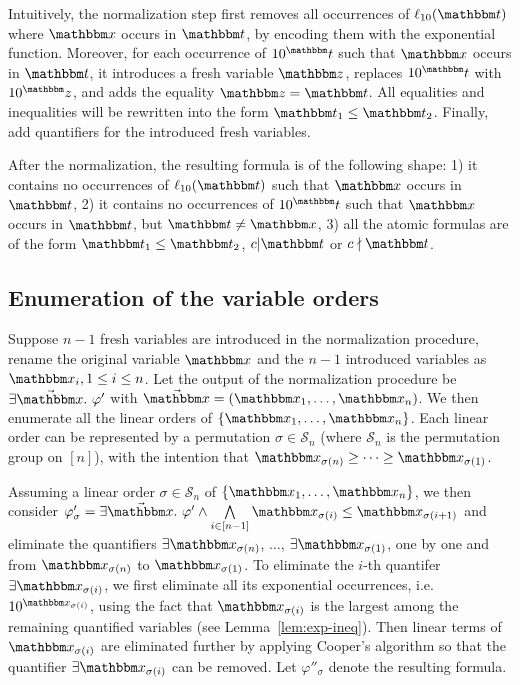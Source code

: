 Intuitively, the normalization step first removes all occurrences of $\ell_{10}(\iterm)$ where $\ivarx$ occurs in $\iterm$, by encoding them with the exponential function. Moreover, for each occurrence of $10^\iterm$ such that $\ivarx$ occurs in $\iterm$, it introduces a fresh variable $\ivarz$, replaces $10^\iterm$ with $10^\ivarz$, and adds the equality $\ivarz = \iterm$. All equalities and inequalities will be rewritten into the form $\iterm_1\le\iterm_2$. Finally, add quantifiers for the introduced fresh variables.

After the normalization, the resulting formula is of the following shape: 1) it contains no occurrences of $\ell_{10}(\iterm)$ such that $\ivarx$ occurs in $\iterm$, 2)  it contains no occurrences of $10^\iterm$ such that $\ivarx$ occurs in $\iterm$, but $\iterm \neq \ivarx$, 3) all the atomic formulas are of the form $\iterm_1 \le \iterm_2$, $c \vert  \iterm$ or $c\nmid \iterm$. 


\subsection{Enumeration of the variable orders}\label{qe-enum}

Suppose $n-1$ fresh variables are introduced in the normalization procedure, rename the original variable $\ivarx$ and the $n-1$ introduced variables as $\ivarx_i,1\le i\le n$.
Let the output of the normalization procedure be $\exists \vec{\ivarx}.\ \varphi'$ with $\vec{\ivarx} = (\ivarx_1,\ldots, \ivarx_n)$. 
We then enumerate all the linear orders of $\{\ivarx_1,\ldots, \ivarx_n\}$. Each linear order can be represented by a permutation $\sigma \in \mathcal{S}_n$ (where $\mathcal{S}_n$ is the permutation group on $[n]$), with the intention that $\ivarx_{\sigma(n)} \ge \cdots \ge \ivarx_{\sigma(1)}$.

Assuming a linear order $\sigma \in \mathcal{S}_n$ of $\{\ivarx_1,\ldots, \ivarx_n\}$, we then consider $\varphi'_\sigma  = \exists \vec{\ivarx}.\ \varphi' \wedge \bigwedge \limits_{i \in [n-1]} \ivarx_{\sigma(i)} \le \ivarx_{\sigma(i+1)}$ and eliminate the quantifiers $\exists \ivarx_{\sigma(n)}$, $\ldots$, $\exists \ivarx_{\sigma(1)}$,  one by one and from $\ivarx_{\sigma(n)}$ to $\ivarx_{\sigma(1)}$. To eliminate the $i$-th quantifer $\exists \ivarx_{\sigma(i)}$, we first eliminate all its exponential occurrences, i.e. $10^{\ivarx_{\sigma(i)}}$, using the fact that $\ivarx_{\sigma(i)}$ is the largest among the remaining quantified variables (see Lemma~\ref{lem:exp-ineq}). Then linear terms of $\ivarx_{\sigma(i)}$ are eliminated further by applying Cooper's algorithm so that the quantifier $\exists \ivarx_{\sigma(i)}$ can be removed. Let $\varphi''_\sigma$ denote the resulting formula.


